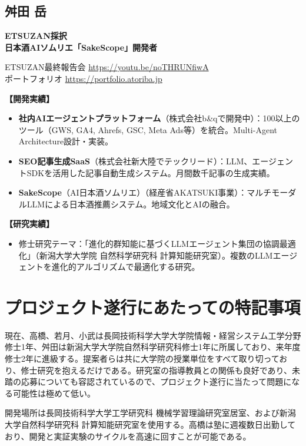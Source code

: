 \documentclass[paper=a4,fontsize=10.5bp,jafontsize=10.5bp,twocolumn]{jlreq}
\begin{document}
\subsection*{舛田 岳}

\noindent\textbf{ETSUZAN採択}\\
\textbf{日本酒AIソムリエ「SakeScope」開発者}

{\small\sffamily
\noindent
ETSUZAN最終報告会 \url{https://youtu.be/noTHRUNfiwA}\\
ポートフォリオ \url{https://portfolio.atoriba.jp}
}

\textbf{【開発実績】}
\begin{itemize}
  \item \textbf{社内AIエージェントプラットフォーム}（株式会社b\&qで開発中）：100以上のツール（GWS, GA4, Ahrefs, GSC, Meta Ads等）を統合。Multi-Agent Architecture設計・実装。
  \item \textbf{SEO記事生成SaaS}（株式会社新大陸でテックリード）：LLM、エージェントSDKを活用した記事自動生成システム。月間数千記事の生成実績。
  \item \textbf{SakeScope}（AI日本酒ソムリエ）（経産省AKATSUKI事業）：マルチモーダルLLMによる日本酒推薦システム。地域文化とAIの融合。
\end{itemize}

\textbf{【研究実績】}
\begin{itemize}
  \item 修士研究テーマ：「進化的群知能に基づくLLMエージェント集団の協調最適化」（新潟大学大学院 自然科学研究科 計算知能研究室）。複数のLLMエージェントを進化的アルゴリズムで最適化する研究。
\end{itemize}

\section{プロジェクト遂行にあたっての特記事項}

現在、高橋、若月、小武は長岡技術科学大学大学院情報・経営システム工学分野修士1年、舛田は新潟大学大学院自然科学研究科修士1年に所属しており、来年度修士2年に進級する。提案者らは共に大学院の授業単位をすべて取り切っており、修士研究を抱えるだけである。研究室の指導教員との関係も良好であり、未踏の応募についても容認されているので、プロジェクト遂行に当たって問題になる可能性は極めて低い。

開発場所は長岡技術科学大学工学研究科 機械学習理論研究室居室、および新潟大学自然科学研究科 計算知能研究室を使用する。高橋は塾に週複数日出勤しており、開発と実証実験のサイクルを高速に回すことが可能である。
\end{document}
